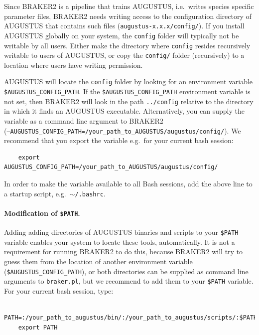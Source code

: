 \documentclass[a4paper,10pt]{report}
\begin{document}
   Since BRAKER2 is a pipeline that trains AUGUSTUS, i.e.~writes species specific parameter files, BRAKER2 needs writing access to the configuration directory of AUGUSTUS that contains such files  (\texttt{augustus-x.x.x/config/}). If you install AUGUSTUS
   globally on your system, the \texttt{config} folder will typically not be writable by all users. Either make the directory where \texttt{config} resides recursively writable to users of AUGUSTUS, or copy the \texttt{config/} folder (recursively) to a location where users have writing permission. 
   
   AUGUSTUS will locate the \texttt{config} folder by looking for an environment variable \texttt{\$AUGUSTUS\_CONFIG\_PATH}. If the \texttt{\$AUGUSTUS\_CONFIG\_PATH} environment variable is not set, then BRAKER2 will look in 
    the path \texttt{../config} relative to the directory in which it finds an AUGUSTUS executable. Alternatively, you can supply the variable as a command line argument to BRAKER2\\ (\texttt{--AUGUSTUS\_CONFIG\_PATH=/your\_path\_to\_AUGUSTUS/augustus/config/}). We recommend that you export the variable e.g.~for your current bash session:

    \begin{verbatim}
    export AUGUSTUS_CONFIG_PATH=/your_path_to_AUGUSTUS/augustus/config/
    \end{verbatim}

In order to make the variable available to all Bash sessions, add the above line to a startup script, e.g.~\texttt{$\sim$/.bashrc}.
   
   \paragraph{Modification of \texttt{\$PATH}.} Adding adding directories of AUGUSTUS binaries and scripts to your \texttt{\$PATH} variable enables your system to locate these tools, automatically. It is not a requirement for running BRAKER2 to do this, because BRAKER2 will try to guess them from the location of another environment variable (\texttt{\$AUGUSTUS\_CONFIG\_PATH}), or both directories can be supplied as command line arguments to \texttt{braker.pl}, but we recommend to add them to your \texttt{\$PATH} variable. For your current bash session, type:

    \begin{verbatim}
    PATH=:/your_path_to_augustus/bin/:/your_path_to_augustus/scripts/:$PATH
    export PATH
    \end{verbatim}
\end{document}
